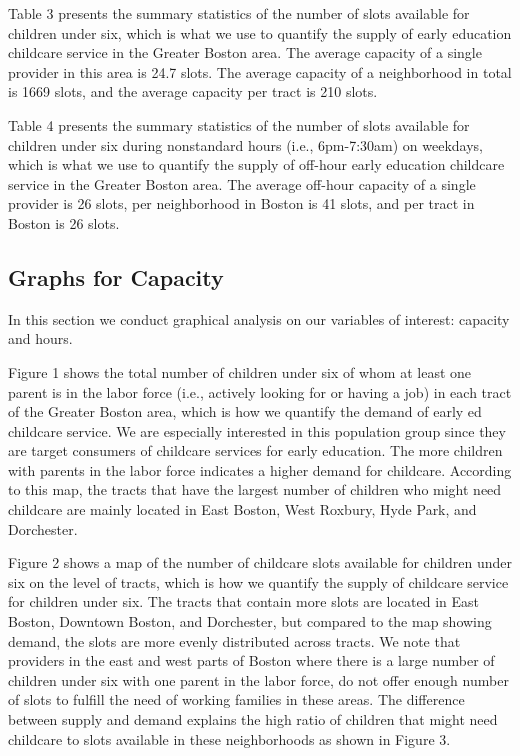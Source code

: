 \documentclass[10pt,letterpaper]{article}
\begin{document}
Table 3 presents the summary statistics of the number of slots available
for children under six, which is what we use to quantify the supply of
early education childcare service in the Greater Boston area. The
average capacity of a single provider in this area is 24.7 slots. The
average capacity of a neighborhood in total is 1669 slots, and the
average capacity per tract is 210 slots.

Table 4 presents the summary statistics of the number of slots available
for children under six during nonstandard hours (i.e., 6pm-7:30am) on
weekdays, which is what we use to quantify the supply of off-hour early
education childcare service in the Greater Boston area. The average
off-hour capacity of a single provider is 26 slots, per neighborhood in
Boston is 41 slots, and per tract in Boston is 26 slots.

\subsection{Graphs for Capacity}\label{graphs-for-capacity}

In this section we conduct graphical analysis on our variables of
interest: capacity and hours.

Figure 1 shows the total number of children under six of whom at least
one parent is in the labor force (i.e., actively looking for or having a
job) in each tract of the Greater Boston area, which is how we quantify
the demand of early ed childcare service. We are especially interested
in this population group since they are target consumers of childcare
services for early education. The more children with parents in the
labor force indicates a higher demand for childcare. According to this
map, the tracts that have the largest number of children who might need
childcare are mainly located in East Boston, West Roxbury, Hyde Park,
and Dorchester.

Figure 2 shows a map of the number of childcare slots available for
children under six on the level of tracts, which is how we quantify the
supply of childcare service for children under six. The tracts that
contain more slots are located in East Boston, Downtown Boston, and
Dorchester, but compared to the map showing demand, the slots are more
evenly distributed across tracts. We note that providers in the east and
west parts of Boston where there is a large number of children under six
with one parent in the labor force, do not offer enough number of slots
to fulfill the need of working families in these areas. The difference
between supply and demand explains the high ratio of children that might
need childcare to slots available in these neighborhoods as shown in
Figure 3.
\end{document}
